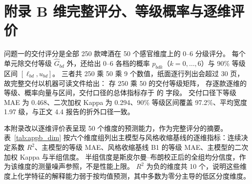 \section*{附录 B 维完整评分、等级概率与逐维评价}

问题一的交付评分是全部 250 款啤酒在 50 个感官维度上的 0--6 分级评分。
每个单元除交付等级 $\hat G_{bd}$ 外，还给出 0--6 各档的概率 $p_{bdk}$（$k=0,\dots,6$）与 90\% 等级区间 $[\ell_{bd},u_{bd}]$。
三者共 250 乘 50 乘 9 个数值，纸面逐行列出会超过 30 页，故完整交付以机器可读文件给出： 存 250 乘 50 的交付等级矩阵， 存逐款逐维的等级、概率向量与区间，交付口径的总体指标存于  的  字段。
交付口径下等级 MAE 为 0.468、二次加权 Kappa 为 0.294、90\% 等级区间覆盖 97.2\%、平均宽度 1.97 级，与正文 4.4 报告的折外口径一致。

本附录改以逐维评价表呈现 50 个维度的预测能力，作为完整评分的摘要。
表~\ref{tab:appb_dim} 按六个维度组列出主模型与风格收缩基线的逐维指标：连续决定系数 $R^2$、主模型的等级 MAE、风格收缩基线 B1 的等级 MAE、主模型的二次加权 Kappa 与半组信度。
半组信度是斯皮尔曼--布朗校正后的全组均分信度，作为该维度的测量噪声参照，不是性能上限。
$R^2$ 为负的维度共 10 个，说明这些维度上化学特征的解释能力弱于按均值预测，其中多数为零分主导的低区分度维度。

